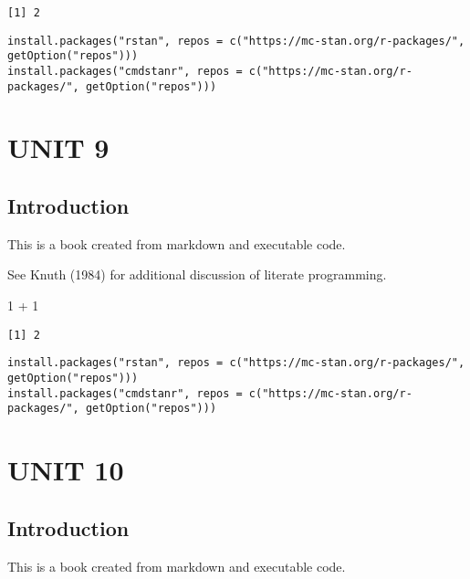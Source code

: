 \documentclass[
  letterpaper,
  DIV=11,
  numbers=noendperiod]{scrreprt}
\newenvironment{Shaded}{\begin{snugshade}}{\end{snugshade}}
\newcommand{\DecValTok}[1]{\textcolor[rgb]{0.68,0.00,0.00}{#1}}
\newcommand{\SpecialCharTok}[1]{\textcolor[rgb]{0.37,0.37,0.37}{#1}}
\begin{document}
\begin{verbatim}
[1] 2
\end{verbatim}

\begin{verbatim}
install.packages("rstan", repos = c("https://mc-stan.org/r-packages/", getOption("repos")))
install.packages("cmdstanr", repos = c("https://mc-stan.org/r-packages/", getOption("repos")))
\end{verbatim}

\part{UNIT 9}

\hypertarget{introduction-6}{%
\chapter{Introduction}\label{introduction-6}}

This is a book created from markdown and executable code.

See Knuth (1984) for additional discussion of literate programming.

\begin{Shaded}
\begin{Highlighting}[]
\DecValTok{1} \SpecialCharTok{+} \DecValTok{1}
\end{Highlighting}
\end{Shaded}

\begin{verbatim}
[1] 2
\end{verbatim}

\begin{verbatim}
install.packages("rstan", repos = c("https://mc-stan.org/r-packages/", getOption("repos")))
install.packages("cmdstanr", repos = c("https://mc-stan.org/r-packages/", getOption("repos")))
\end{verbatim}

\part{UNIT 10}

\hypertarget{introduction-7}{%
\chapter{Introduction}\label{introduction-7}}

This is a book created from markdown and executable code.
\end{document}
